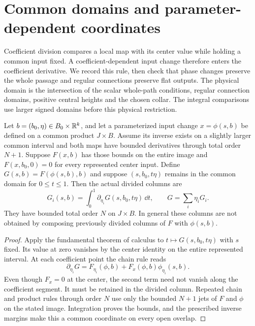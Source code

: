 \section{Common domains and parameter-dependent coordinates}
\label{rw:app:domains}

Coefficient division compares a local map with its center value while
holding a common input fixed. A coefficient-dependent input change
therefore enters the coefficient derivative. We record this rule,
then check that phase changes preserve the whole passage and regular
connections preserve flat outputs. The physical domain is the
intersection of the scalar whole-path conditions, regular connection
domains, positive central heights and the chosen collar. The integral
comparisons use larger signed domains before this physical restriction.

\begin{lemma}
\label{rw:app:fixed-input-division}
Let $b=(b_0,\eta)\in B_0\times\mathbb R^k$, and let a parameterized
input change $x=\phi(s,b)$ be defined on a common product $J\times B$.
Assume its inverse exists on a slightly larger common interval and both
maps have bounded derivatives through total order $N+1$.
Suppose $F(x,b)$ has those bounds on the entire image and
$F(x,b_0,0)=0$ for every represented center input. Define
$G(s,b)=F(\phi(s,b),b)$ and suppose
$(s,b_0,t\eta)$ remains in the common domain for $0\le t\le1$.
Then the actual divided columns are
\[
 G_i(s,b)=\int_0^1\partial_{\eta_i}G(s,b_0,t\eta)\,\dd t,
 \qquad G=\sum_i\eta_iG_i.
\]
They have bounded total order $N$ on $J\times B$. In general these
columns are not obtained by composing previously divided columns of $F$
with $\phi(s,b)$.
\end{lemma}
\begin{proof}
Apply the fundamental theorem of calculus to
$t\mapsto G(s,b_0,t\eta)$ with $s$ fixed. Its value at zero
vanishes by the center identity on the entire represented interval.
At each coefficient point the chain rule reads
\[
 \partial_{\eta_i}G
 =F_{\eta_i}(\phi,b)+F_x(\phi,b)\phi_{\eta_i}(s,b).
\]
Even though $F_x=0$ at the center, the second term need not vanish
along the coefficient segment. It must be retained in the divided
column.
Repeated chain and product rules through order $N$ use only the
bounded $N+1$ jets of $F$ and $\phi$ on the stated image. Integration
proves the bounds, and the prescribed inverse margins make this a
common coordinate on every open overlap.
\end{proof}

